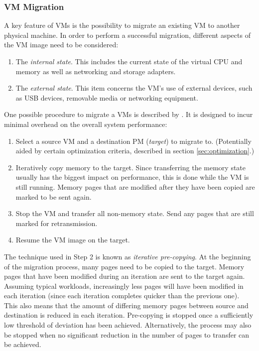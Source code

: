 \documentclass[12pt, a4paper]{scrartcl}
\begin{document}
\subsubsection{VM Migration}\label{sec:migration}
A key feature of \acp{VM} is the possibility to migrate an existing \ac{VM} to another physical machine.
In order to perform a successful migration, different aspects of the \ac{VM} image need to be considered:
\begin{enumerate}
    \item
        The \emph{internal state}.
        This includes the current state of the virtual CPU and memory as well as networking and storage adapters.
        
    \item
        The \emph{external state}.
        This item concerns the \ac{VM}'s use of external devices, such as USB devices, removable media or networking equipment.
\end{enumerate}
One possible procedure to migrate a \acp{VM} is described by \textcite{clark_migration_2005}.
It is designed to incur minimal overhead on the overall system performance:
\begin{enumerate}
    \item
        Select a source \ac{VM} and a destination \ac{PM} (\emph{target}) to migrate to.
        (Potentially aided by certain optimization criteria, described in section \ref{sec:optimization}.)

    \item
        Iteratively copy memory to the target.
        Since transferring the memory state usually has the biggest impact on performance, this is done while the \ac{VM} is still running.
        Memory pages that are modified after they have been copied are marked to be sent again.

    \item
        Stop the \ac{VM} and transfer all non-memory state.
        Send any pages that are still marked for retransmission.

    \item
        Resume the \ac{VM} image on the target.
\end{enumerate}
The technique used in Step 2 is known as \emph{iterative pre-copying}.
At the beginning of the migration process, many pages need to be copied to the target.
Memory pages that have been modified during an iteration are sent to the target again.
Assuming typical workloads, increasingly less pages will have been modified in each iteration (since each iteration completes quicker than the previous one).
This also means that the amount of differing memory pages between source and destination is reduced in each iteration.
Pre-copying is stopped once a sufficiently low threshold of deviation has been achieved.
Alternatively, the process may also be stopped when no significant reduction in the number of pages to transfer can be achieved.
\end{document}
